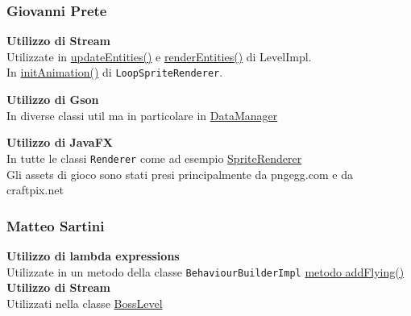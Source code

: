 \documentclass{article}
\begin{document}
\subsubsection{Giovanni Prete}
\textbf{Utilizzo di Stream}\\
Utilizzate in \href{https://github.com/dennnanni/UNIBOssfight/blob/0768464f3f7be0d1f35435f89616902091c0b7a8/UNIBOSSfight/src/main/java/app/impl/level/LevelImpl.java#L72}{updateEntities()} e \href{https://github.com/dennnanni/UNIBOssfight/blob/0768464f3f7be0d1f35435f89616902091c0b7a8/UNIBOSSfight/src/main/java/app/impl/level/LevelImpl.java#L125}{renderEntities()} di LevelImpl.\\
In \href{https://github.com/dennnanni/UNIBOssfight/blob/0b788e3202136a52ea940d4dedaac28589c7eb66/UNIBOSSfight/src/main/java/app/impl/component/LoopSpriteRenderer.java#L76}{initAnimation()} di \texttt{LoopSpriteRenderer}.

\textbf{Utilizzo di Gson}\\
In diverse classi util ma in particolare in \href{https://github.com/dennnanni/UNIBOssfight/blob/0b788e3202136a52ea940d4dedaac28589c7eb66/UNIBOSSfight/src/main/java/app/util/DataManager.java}{DataManager}

\textbf{Utilizzo di JavaFX}\\
In tutte le classi \texttt{Renderer} come ad esempio \href{https://github.com/dennnanni/UNIBOssfight/blob/0b788e3202136a52ea940d4dedaac28589c7eb66/UNIBOSSfight/src/main/java/app/impl/component/SpriteRenderer.java#L55}{SpriteRenderer}\\

Gli assets di gioco sono stati presi principalmente da pngegg.com e da craftpix.net

\subsubsection{Matteo Sartini}
\textbf{Utilizzo di lambda expressions}\\
Utilizzate in un metodo della classe \texttt{BehaviourBuilderImpl}
\href{https://github.com/dennnanni/UNIBOssfight/blob/1f248b375d7cf6e1bf10144a9acbacf9b59ca3b5/UNIBOSSfight/src/main/java/app/impl/builder/BehaviourBuilderImpl.java#L79}{metodo addFlying()}
\textbf{Utilizzo di Stream}\\
Utilizzati nella classe \href{https://github.com/dennnanni/UNIBOssfight/blob/1f248b375d7cf6e1bf10144a9acbacf9b59ca3b5/UNIBOSSfight/src/main/java/app/impl/level/BossLevel.java#L19}{BossLevel}
\end{document}
